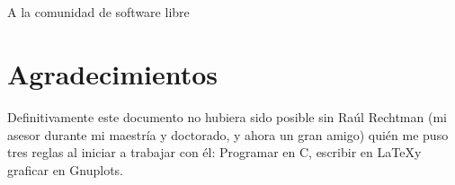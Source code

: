 \chapter*{}
\thispagestyle{empty}


\begin{center}
A la comunidad  de software libre
\end{center}

\newpage
\thispagestyle{empty}
\chapter*{Agradecimientos}

Definitivamente este documento no hubiera sido posible sin  Raúl Rechtman (mi asesor durante mi maestría y doctorado, y ahora un gran amigo) quién me puso tres reglas al iniciar a trabajar con él: Programar en C, escribir en \LaTeX y graficar en Gnuplots.
